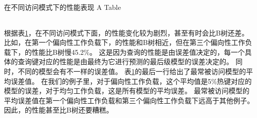 \begin{table}[!hpb]
  \centering
  \bicaption[指向一个表格的表目录索引]
    {{\li}在不同访问模式下的性能表现}
    {A Table}
  \label{tab:pattern}
  \begin{tabular}{@{}llr@{}} \toprule
  \end{tabular}
\end{table}

根据表\ref{tab:pattern}，在不同访问模式下面，{\li}的性能变化较为剧烈，甚至有时会比B树还差。
比如，在第一个偏向性工作负载下，{\li}的性能和B树相近，但在第三个偏向性工作负载下，{\li}的性能比B树慢45.2\%。
这是因为查询的性能是由误差值决定的，每一个具体的查询键对应的性能是由最终为它进行预测的最后级模型的误差决定的。
同时，不同的模型会有不一样的误差值。
表\ref{tab:pattern}的最后一行给出了最常被访问模型的平均误差值。
在我们的例子里，对于偏向性工作负载，这个平均值是5\%热键对应的模型的误差，对于均匀工作负载，这是所有模型的平均误差。
最常被访问模型的平均误差值在第一个偏向性工作负载和第三个偏向性工作负载下远高于其他例子。
因此，{\li}的性能甚至比B树还要糟糕。


